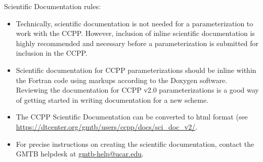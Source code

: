 Scientific Documentation rules:
\begin{itemize}
\item Technically, scientific documentation is not needed for a parameterization to work with the CCPP. However, inclusion of inline scientific documentation is highly recommended and necessary before a parameterization is submitted for inclusion in the CCPP. 
\item Scientific documentation for CCPP parameterizations should be inline within the Fortran code using markups according to the Doxygen software. Reviewing the documentation for CCPP v2.0 parameterizations is a good way of getting started in writing documentation for a new scheme.
\item The CCPP Scientific Documentation can be converted to html format (see \url{https://dtcenter.org/gmtb/users/ccpp/docs/sci_doc_v2/}.
\item For precise instructions on creating the scientific documentation, contact the GMTB helpdesk at \url{gmtb-help@ucar.edu}.
\end{itemize}
\begin{sidewaysfigure}

\end{sidewaysfigure}

